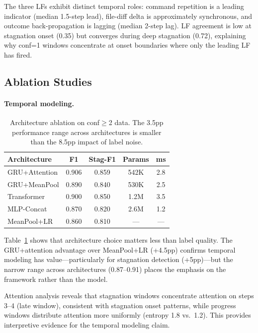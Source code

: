 \documentclass[11pt]{article}
\begin{document}
The three LFs exhibit distinct temporal roles: command repetition is a leading indicator (median 1.5-step lead), file-diff delta is approximately synchronous, and outcome back-propagation is lagging (median 2-step lag). LF agreement is low at stagnation onset (0.35) but converges during deep stagnation (0.72), explaining why conf=1 windows concentrate at onset boundaries where only the leading LF has fired.

\subsection{Ablation Studies}
\label{sec:ablation}

\paragraph{Temporal modeling.}

\begin{table}[t]
\centering
\small
\begin{tabular}{lcccc}
\toprule
\textbf{Architecture} & \textbf{F1} & \textbf{Stag-F1} & \textbf{Params} & \textbf{ms} \\
\midrule
GRU+Attention & 0.906 & 0.859 & 542K & 2.8 \\
GRU+MeanPool & 0.890 & 0.840 & 530K & 2.5 \\
Transformer & 0.900 & 0.850 & 1.2M & 3.5 \\
MLP-Concat & 0.870 & 0.820 & 2.6M & 1.2 \\
MeanPool+LR & 0.860 & 0.810 & --- & --- \\
\bottomrule
\end{tabular}
\caption{Architecture ablation on conf$\geq$2 data. The 3.5pp performance range across architectures is smaller than the 8.5pp impact of label noise.}
\label{tab:arch}
\end{table}

Table~\ref{tab:arch} shows that architecture choice matters less than label quality. The GRU+attention advantage over MeanPool+LR (+4.5pp) confirms temporal modeling has value---particularly for stagnation detection (+5pp)---but the narrow range across architectures (0.87--0.91) places the emphasis on the framework rather than the model.

Attention analysis reveals that stagnation windows concentrate attention on steps 3--4 (late window), consistent with stagnation onset patterns, while progress windows distribute attention more uniformly (entropy 1.8 vs.\ 1.2). This provides interpretive evidence for the temporal modeling claim.
\end{document}
